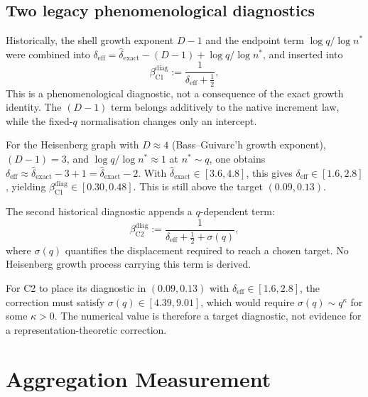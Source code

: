 \documentclass[11pt,a4paper]{article}
\newcommand{\dexact}{\hat{\delta}_{\mathrm{exact}}}
\newcommand{\deff}{\delta_{\mathrm{eff}}}
\begin{document}
\subsection{Two legacy phenomenological diagnostics}
\label{sec:scenarios}

\begin{description}[style=nextline]
\item[Diagnostic C1: imported reciprocal form]
Historically, the shell growth exponent $D-1$ and the endpoint term
$\log q/\log n^{*}$ were combined into
$\deff = \dexact - (D - 1) + \log q / \log n^{*}$,
and inserted into
\begin{equation}
\label{eq:C1}
\beta_{\mathrm{C1}}^{\mathrm{diag}} := \frac{1}{\deff + \tfrac{1}{2}},
\end{equation}
This is a phenomenological diagnostic, not a consequence of the exact growth identity.
The $(D-1)$ term belongs additively to the native increment law, while the fixed-$q$
normalisation changes only an intercept.

For the Heisenberg graph with $D \approx 4$ (Bass--Guivarc'h
growth exponent), $(D-1) = 3$, and
$\log q / \log n^{*} \approx 1$ at $n^{*} \sim q$,
one obtains $\deff \approx \dexact - 3 + 1 = \dexact - 2$.
With $\dexact \in [3.6, 4.8]$, this gives
$\deff \in [1.6, 2.8]$, yielding $\beta_{\mathrm{C1}}^{\mathrm{diag}} \in [0.30, 0.48]$.
This is still above the target $(0.09, 0.13)$.

\item[Diagnostic C2: additional denominator term]
The second historical diagnostic appends a $q$-dependent term:
\begin{equation}
\label{eq:C2}
\beta_{\mathrm{C2}}^{\mathrm{diag}} := \frac{1}{\deff + \tfrac{1}{2} + \sigma(q)},
\end{equation}
where $\sigma(q)$ quantifies the displacement required to reach a chosen target.
No Heisenberg growth process carrying this term is derived.

For C2 to place its diagnostic in $(0.09,0.13)$ with
$\deff \in [1.6, 2.8]$, the correction must satisfy
$\sigma(q) \in [4.39, 9.01]$, which would require
$\sigma(q) \sim q^{\kappa}$ for some $\kappa > 0$.
The numerical value is therefore a target diagnostic, not evidence for a
representation-theoretic correction.
\end{description}

\section{Aggregation Measurement}
\label{sec:discrimination}
\end{document}
